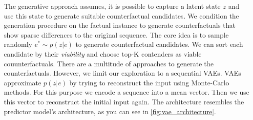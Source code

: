\documentclass[./../../paper.tex]{subfiles}
\begin{document}




The generative approach assumes, it is possible to capture a latent state $z$ and use this state to generate suitable counterfactual candidates. We condition the generation procedure on the factual instance to generate counterfactuals that show sparse differences to the original sequence. The core idea is to sample randomly $e^* \sim p(z|e)$ to generate counterfactual candidates. We can sort each candidate by their \emph{viability} and choose top-K contenders as viable couunterfactuals. There are a multitude of approaches to generate the counterfactuals. However, we limit our exploration to a sequential \glspl{VAE}. 
\glspl{VAE} approximate $p(z|e)$ by trying to reconstruct the input using Monte-Carlo methods. For this purpose we encode a sequence into a mean vector. Then we use this vector to reconstruct the initial input again. The architecture resembles the predictor model's architecture, as you can see in \autoref{fig:vae_architecture}.   
\end{document}
